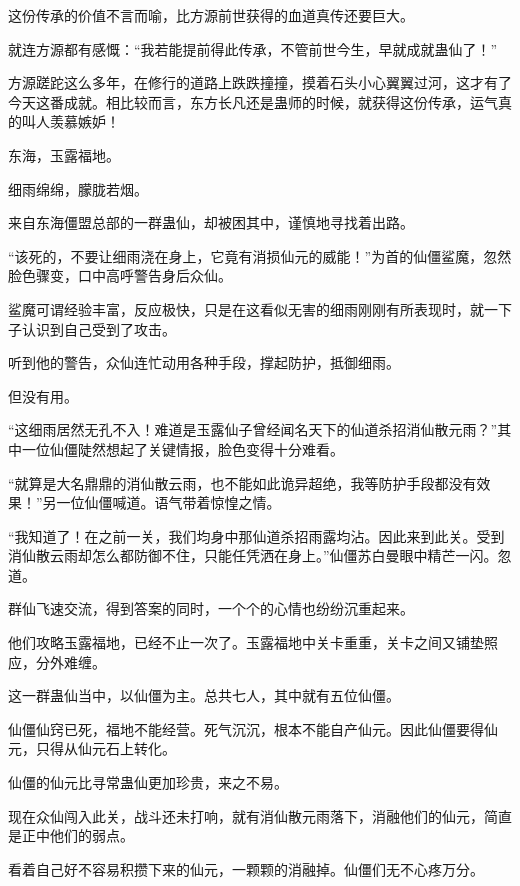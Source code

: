 
\begin{this_body}



这份传承的价值不言而喻，比方源前世获得的血道真传还要巨大。

就连方源都有感慨：“我若能提前得此传承，不管前世今生，早就成就蛊仙了！”

方源蹉跎这么多年，在修行的道路上跌跌撞撞，摸着石头小心翼翼过河，这才有了今天这番成就。相比较而言，东方长凡还是蛊师的时候，就获得这份传承，运气真的叫人羡慕嫉妒！

东海，玉露福地。

细雨绵绵，朦胧若烟。

来自东海僵盟总部的一群蛊仙，却被困其中，谨慎地寻找着出路。

“该死的，不要让细雨浇在身上，它竟有消损仙元的威能！”为首的仙僵鲨魔，忽然脸色骤变，口中高呼警告身后众仙。

鲨魔可谓经验丰富，反应极快，只是在这看似无害的细雨刚刚有所表现时，就一下子认识到自己受到了攻击。

听到他的警告，众仙连忙动用各种手段，撑起防护，抵御细雨。

但没有用。

“这细雨居然无孔不入！难道是玉露仙子曾经闻名天下的仙道杀招消仙散元雨？”其中一位仙僵陡然想起了关键情报，脸色变得十分难看。

“就算是大名鼎鼎的消仙散云雨，也不能如此诡异超绝，我等防护手段都没有效果！”另一位仙僵喊道。语气带着惊惶之情。

“我知道了！在之前一关，我们均身中那仙道杀招雨露均沾。因此来到此关。受到消仙散云雨却怎么都防御不住，只能任凭洒在身上。”仙僵苏白曼眼中精芒一闪。忽道。

群仙飞速交流，得到答案的同时，一个个的心情也纷纷沉重起来。

他们攻略玉露福地，已经不止一次了。玉露福地中关卡重重，关卡之间又铺垫照应，分外难缠。

这一群蛊仙当中，以仙僵为主。总共七人，其中就有五位仙僵。

仙僵仙窍已死，福地不能经营。死气沉沉，根本不能自产仙元。因此仙僵要得仙元，只得从仙元石上转化。

仙僵的仙元比寻常蛊仙更加珍贵，来之不易。

现在众仙闯入此关，战斗还未打响，就有消仙散元雨落下，消融他们的仙元，简直是正中他们的弱点。

看着自己好不容易积攒下来的仙元，一颗颗的消融掉。仙僵们无不心疼万分。


\end{this_body}
